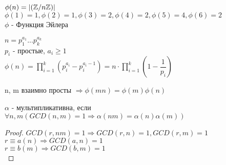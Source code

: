 $ \phi(n) = | (\mathbb{Z} / n\mathbb{Z} ) | $ \\
$ \phi(1) = 1, \phi(2) = 1, \phi(3) = 2, \phi(4) = 2, \phi(5) = 4, \phi(6) = 2 $ \\
$ \phi $ - Функция Эйлера \\
\begin{theorem}
	$ n = p_1^{a_1} ... p_k^{a_k} $ \\
	$ p_i $ - простые, $ a_i \geq 1 $ \\
	$ \phi(n) = \prod_{i=1}^{k} (p_i^{a_i} - p_i^{a_i-1}) = n \cdot \prod_{i=1}^k (1 - \dfrac{1}{p_i}) $ 
	\begin{lemma}
		n, m взаимно просты $ \Rightarrow \phi(mn) = \phi(m)\phi(n) $ \\
		\begin{definition}
			$ \alpha $ - мультипликативна, если \\
			$ \forall n,m (GCD(n,m) = 1 \Rightarrow \alpha(nm) = \alpha(n)\alpha(m)) $ 
		\end{definition}
		\begin{proof}
			$ GCD(r, nm) = 1 \Rightarrow GCD(r, n) = 1, GCD(r, m) = 1 $ \\ 
			$ r \equiv a(n) \Rightarrow GCD(a, n) = 1 $ \\
			$ r \equiv b(m) \Rightarrow GCD(b,m) = 1 $ \\
			

\end{proof}
\end{lemma}
\end{theorem}
